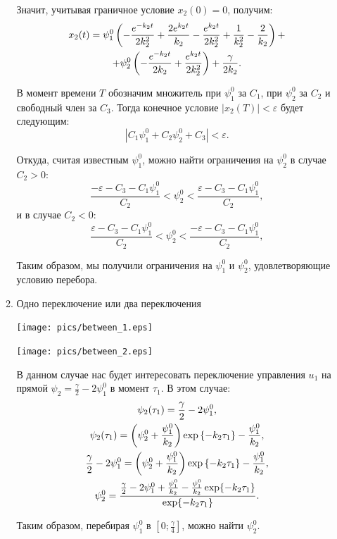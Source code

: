 \documentclass[11pt]{article}
\newcommand\abs[1]{\left\lvert#1\right\rvert}
\begin{document}
\begin{enumerate}
\begin{enumerate}
Значит, учитывая граничное условие $x_2(0) = 0$, получим:
\begin{gather}
x_2(t) = \psi_1^0 \left( -\frac{e^{-k_2 t}}{2k_2^2} + \frac{2e^{k_2 t}}{k_2} - \frac{e^{k_2 t}}{2k_2^2} + \frac{1}{k_2^2} - \frac{2}{k_2}\right) + \notag \\
+ \psi_2^0 \left( -\frac{e^{-k_2 t}}{2k_2} + \frac{e^{k_2 t}}{2k_2^2} \right) + \frac{\gamma}{2k_2}. \notag
\end{gather}

В момент времени $T$ обозначим множитель при $\psi_1^0$ за $C_1$, при $\psi_2^0$ за $C_2$ и свободный член за $C_3$. Тогда конечное условие $\abs{x_2(T)} < \varepsilon$ будет следующим:
$$
\abs{C_1 \psi_1^0 + C_2 \psi_2^0 + C_3} < \varepsilon.
$$

Откуда, считая известным $\psi_1^0$, можно найти ограничения на $\psi_2^0$ в случае $C_2 > 0$:
$$
\frac{-\varepsilon - C_3 - C_1 \psi_1^0}{C_2} < \psi_2^0 < \frac{\varepsilon - C_3 - C_1 \psi_1^0}{C_2},
$$
и в случае $C_2 < 0$:
$$
\frac{\varepsilon - C_3 - C_1 \psi_1^0}{C_2} < \psi_2^0 < \frac{-\varepsilon - C_3 - C_1 \psi_1^0}{C_2},
$$

Таким образом, мы получили ограничения на $\psi_1^0$ и $\psi_2^0$, удовлетворяющие условию перебора.

\item
Одно переключение или два переключения

\texttt{[image: pics/between\_1.eps]}

\texttt{[image: pics/between\_2.eps]}

В данном случае нас будет интересовать переключение управления $u_1$ на прямой $\psi_2 = \frac{\gamma}{2} - 2\psi_1^0$ в момент $\tau_1$. В этом случае:
\begin{gather}
\psi_2(\tau_1) = \frac{\gamma}{2} - 2\psi_1^0, \notag \\
\psi_2(\tau_1) = \left( \psi_2^0 + \frac{\psi_1^0}{k_2} \right) \exp \left\{ -k_2 \tau_1 \right\} - \frac{\psi_1^0}{k_2}, \notag \\
\frac{\gamma}{2} - 2\psi_1^0 = \left( \psi_2^0 + \frac{\psi_1^0}{k_2} \right) \exp \left\{ -k_2 \tau_1 \right\} - \frac{\psi_1^0}{k_2}, \notag \\
\psi_2^0 = \frac{\frac{\gamma}{2} - 2\psi_1^0 + \frac{\psi_1^0}{k_2} - \frac{\psi_1^0}{k_2}\exp\{-k_2 \tau_1\}}{\exp\{-k_2 \tau_1\}}. \notag	
\end{gather}

Таким образом, перебирая $\psi_1^0$ в $[0; \tfrac{\gamma}{4}]$, можно найти $\psi_2^0$.
\end{enumerate}


\end{enumerate}
\end{document}
